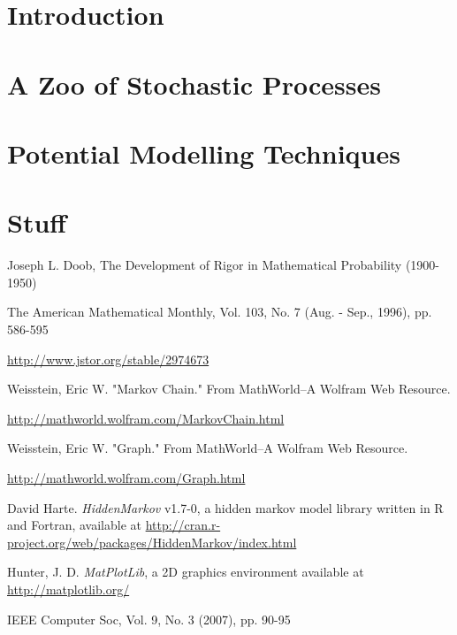 \documentclass{report}
\begin{document}


\tableofcontents

\chapter{Introduction}



\chapter{A Zoo of Stochastic Processes}



\chapter{Potential Modelling Techniques}



\appendix
\chapter{Stuff}

\begin{thebibliography}{9}

	Joseph L. Doob, The Development of Rigor in Mathematical Probability (1900-1950)

	The American Mathematical Monthly, Vol. 103, No. 7 (Aug. - Sep., 1996), pp. 586-595

	\url{http://www.jstor.org/stable/2974673}

	Weisstein, Eric W. "Markov Chain." From MathWorld--A Wolfram Web Resource. 

	\url{http://mathworld.wolfram.com/MarkovChain.html}

	Weisstein, Eric W. "Graph." From MathWorld--A Wolfram Web Resource. 
	
	\url{http://mathworld.wolfram.com/Graph.html}

	David Harte. \emph{HiddenMarkov} v1.7-0, a hidden markov model library written in R and Fortran, available at	\url{http://cran.r-project.org/web/packages/HiddenMarkov/index.html}

	Hunter, J. D. \emph{MatPlotLib}, a 2D graphics environment available at \url{http://matplotlib.org/}

	IEEE Computer Soc, Vol. 9, No. 3 (2007), pp. 90-95
\end{thebibliography}
\end{document}
